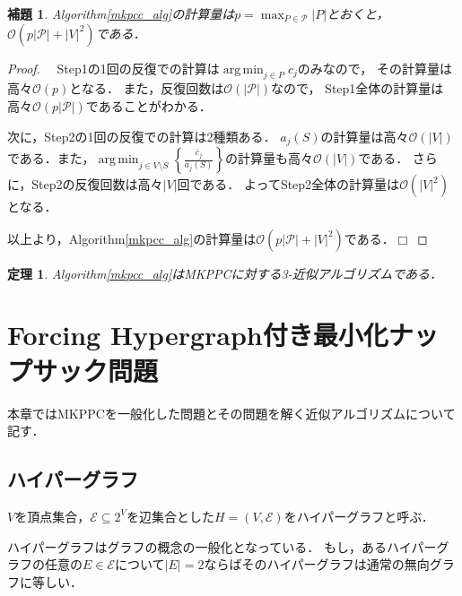 \documentclass[11pt,dvipdfmx]{jarticle}
\def\qed{\hfill $\Box$}
\DeclareMathOperator*{\argmin}{arg\,min}
\numberwithin{equation}{section}
\newtheorem{theorem}{定理}[section]
\newtheorem{lem}{補題}[section]
\newtheorem{proof}{証明}
\begin{document}
        \begin{lem}
            \rm Algorithm\ref{mkpcc_alg}の計算量は$p=\displaystyle\max_{P\in\mathcal{P}}{|P|}$とおくと，$\mathcal{O}(p|\mathcal{P}|+|V|^2)$である．
            \label{order1}
        \end{lem}
        \begin{proof}
            \rm　Step1の1回の反復での計算は$\argmin_{j\in P}{c_j}$のみなので，
            その計算量は高々$\mathcal{O}(p)$となる．
            また，反復回数は$\mathcal{O}(|\mathcal{P}|)$なので，
            Step1全体の計算量は高々$\mathcal{O}(p|\mathcal{P}|)$であることがわかる．\par
            次に，Step2の1回の反復での計算は2種類ある．
            $a_j(S)$の計算量は高々$\mathcal{O}(|V|)$である．また，$\argmin_{j\in V\setminus S}\left\{\frac{\bar{c}_j}{a_j(S)}\right\}$の計算量も高々$\mathcal{O}(|V|)$である．
            さらに，Step2の反復回数は高々$|V|$回である．
            よってStep2全体の計算量は$\mathcal{O}(|V|^2)$となる．\par
            以上より，Algorithm\ref{mkpcc_alg}の計算量は$\mathcal{O}(p|\mathcal{P}|+|V|^2)$である．\qed
        \end{proof}
        \begin{theorem}
            \rm Algorithm\ref{mkpcc_alg}はMKPPCに対する3-近似アルゴリズムである．
        \end{theorem}
\section{Forcing Hypergraph付き最小化ナップサック問題}
    本章ではMKPPCを一般化した問題とその問題を解く近似アルゴリズムについて記す．
    \subsection{ハイパーグラフ}
        $V$を頂点集合，$\mathcal{E}\subseteq2^V$を辺集合とした$H=(V,\mathcal{E})$をハイパーグラフと呼ぶ\cite{HG}．\par
        ハイパーグラフはグラフの概念の一般化となっている．
        もし，あるハイパーグラフの任意の$E\in\mathcal{E}$について$|E|=2$ならばそのハイパーグラフは通常の無向グラフに等しい．
    
\end{document}
